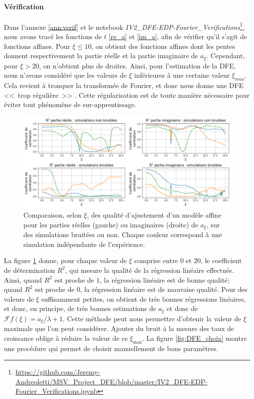 \documentclass[12pt]{article}
\newcommand{\fr}{\mathcal{F}}
\begin{document}
\paragraph{Vérification} Dans l'annexe \ref{ann:verif} et le notebook \emph{IV2\_DFE-EDP-Fourier\_Verifications}\footnote{\url{https://github.com/Jeremy-Andreoletti/MSV_Project_DFE/blob/master/IV2_DFE-EDP-Fourier_Verifications.ipynb}}, nous avons tracé les fonctions de $t$ \eqref{re_a} et \eqref{im_a}, afin de vérifier qu'il s'agit de fonctions affines. Pour $\xi\leqslant 10$, on obtient des fonctions affines dont les pentes donnent respectivement la partie réelle et la partie imaginaire de $a_{\xi}$. Cependant, pour $\xi>20$, on n'obtient plus de droites. Ainsi, pour l'estimation de la DFE, nous n'avons considéré que les valeurs de $\xi$ inférieures à une certaine valeur $\xi_{max}$. Cela revient à tronquer la transformée de Fourier, et donc nous donne une DFE <<~trop régulière~>> . Cette régularisation est de toute manière nécessaire pour éviter tout phénomène de sur-apprentissage.

\begin{figure}[h]
  \begin{center}
    \includegraphics[width=0.95\linewidth]{../Img/DFE_R2.png}
  \end{center}
  \caption{\label{fig:DFE_R2}Comparaison, selon $\xi$, des qualité d'ajustement d'un modèle affine pour les parties réelles (gauche) ou imaginaires (droite) de $a_{\xi}$, sur des simulations bruitées ou non. Chaque couleur correspond à une simulation indépendante de l'expérience.}
\end{figure}

La figure \ref{fig:DFE_R2} donne, pour chaque valeur de $\xi$ comprise entre $0$ et $20$, le coefficient de détermination $R^2$, qui mesure la qualité de la régression linéaire effectuée. Ainsi, quand $R^2$ est proche de $1$, la régression linéaire est de bonne qualité; quand $R^2$ est proche de $0$, la régression linéaire est de mauvaise qualité. Pour des valeurs de $\xi$ suffisamment petites, on obtient de très bonnes régressions linéaires, et donc, en principe, de très bonnes estimations de $a_{\xi}$ et donc de $\fr f(\xi)=a_{\xi}/\lambda+1$. Cette méthode peut nous permettre d'obtenir la valeur de $\xi$ maximale que l'on peut considérer. Ajouter du bruit à la mesure des taux de croissance oblige à réduire la valeur de ce $\xi_{\max}$. La figure \ref{fig:DFE_choix} montre une procédure qui permet de choisir manuellement de bons paramètres.
\end{document}
